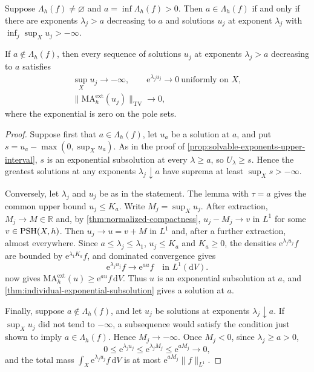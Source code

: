 \begin{proposition}\label{prop:positive-exponent-endpoint-attainment}
Suppose $\Lambda_h(f)\ne\varnothing$ and $a=\inf\Lambda_h(f)>0$. Then $a\in\Lambda_h(f)$ if and only if there are exponents $\lambda_j>a$ decreasing to $a$ and solutions $u_j$ at exponent $\lambda_j$ with $\inf_j\sup_Xu_j> -\infty$.

If $a\notin\Lambda_h(f)$, then every sequence of solutions $u_j$ at exponents $\lambda_j>a$ decreasing to $a$ satisfies
\begin{gather*}
 \sup_Xu_j\longrightarrow-\infty,\qquad
 \mathrm e^{\lambda_ju_j}\longrightarrow0\ \text{uniformly on }X,\\
 \|\mathrm{MA}^{\mathrm{ext}}_h(u_j)\|_{\mathrm{TV}}
                \longrightarrow0,
\end{gather*}
where the exponential is zero on the pole sets.
\end{proposition}
\begin{proof}
Suppose first that $a\in\Lambda_h(f)$, let $u_a$ be a solution at $a$, and put $s=u_a-\max(0,\sup_Xu_a)$. As in the proof of \cref{prop:solvable-exponents-upper-interval}, $s$ is an exponential subsolution at every $\lambda\geq a$, so $U_\lambda\geq s$. Hence the greatest solutions at any exponents $\lambda_j\downarrow a$ have suprema at least $\sup_Xs>-\infty$.

Conversely, let $\lambda_j$ and $u_j$ be as in the statement. The lemma with $\tau=a$ gives the common upper bound $u_j\leq K_a$. Write $M_j=\sup_Xu_j$. After extraction, $M_j\to M\in\mathbb R$ and, by \cref{thm:normalized-compactness}, $u_j-M_j\to v$ in $L^1$ for some $v\in\mathrm{PSH}(X,h)$. Then $u_j\to u=v+M$ in $L^1$ and, after a further extraction, almost everywhere. Since $a\leq\lambda_j\leq\lambda_1$, $u_j\leq K_a$ and $K_a\geq0$, the densities $\mathrm e^{\lambda_ju_j}f$ are bounded by $\mathrm e^{\lambda_1K_a}f$, and dominated convergence gives
\[
 \mathrm e^{\lambda_ju_j}f\longrightarrow\mathrm e^{au}f
              \quad\text{in }L^1(\mathrm dV).
\]
 now gives $\mathrm{MA}^{\mathrm{ext}}_h(u)\geq\mathrm e^{au}f\,\mathrm dV$. Thus $u$ is an exponential subsolution at $a$, and \cref{thm:individual-exponential-subsolution} gives a solution at $a$.

Finally, suppose $a\notin\Lambda_h(f)$, and let $u_j$ be solutions at exponents $\lambda_j\downarrow a$. If $\sup_Xu_j$ did not tend to $-\infty$, a subsequence would satisfy the condition just shown to imply $a\in\Lambda_h(f)$. Hence $M_j\to-\infty$. Once $M_j<0$, since $\lambda_j\geq a>0$,
\[
 0\leq\mathrm e^{\lambda_ju_j}\leq\mathrm e^{\lambda_jM_j}\leq\mathrm e^{aM_j}
                 \longrightarrow0,
\]
and the total mass $\int_X\mathrm e^{\lambda_ju_j}f\,\mathrm dV$ is at most $\mathrm e^{aM_j}\|f\|_{L^1}$.
\end{proof}

